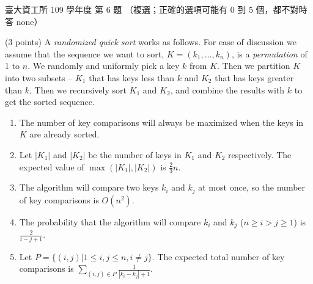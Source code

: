 \begin{pastexam}[label={px:ntu-109-dsaa-06}]{臺大資工所 109 學年度 第 6 題}
（複選；正確的選項可能有 0 到 5 個，都不對時答 none）

(3 points) A \textit{randomized quick sort} works as follows. For ease of discussion we assume
that the sequence we want to sort, $K=(k_1,\ldots,k_n)$, is a \textit{permutation} of 1 to $n$.
We randomly and uniformly pick a key $k$ from $K$. Then we partition $K$ into two subsets --
$K_1$ that has keys less than $k$ and $K_2$ that has keys greater than $k$. Then we recursively
sort $K_1$ and $K_2$, and combine the results with $k$ to get the sorted sequence.
\begin{enumerate}[label=\arabic*.]
\item The number of key comparisons will always be maximized when the keys in $K$ are already
sorted.
\item Let $|K_1|$ and $|K_2|$ be the number of keys in $K_1$ and $K_2$ respectively. The expected
value of $\max(|K_1|,|K_2|)$ is $\frac{2}{3}n$.
\item The algorithm will compare two keys $k_i$ and $k_j$ at most once, so the number of key
comparisons is $O(n^2)$.
\item The probability that the algorithm will compare $k_i$ and $k_j$ ($n\ge i>j\ge 1$) is
$\frac{2}{i-j+1}$.
\item Let $P=\{(i,j)|1\le i,j\le n, i\ne j\}$. The expected total number of key comparisons is
$\sum_{(i,j)\in P}\frac{1}{|k_i-k_j|+1}$.
\end{enumerate}
\end{pastexam}

